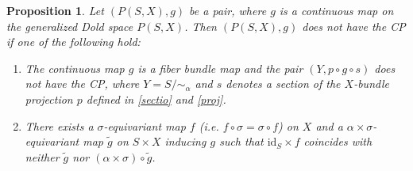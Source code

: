 \documentclass{amsart}
\newtheorem{proposition}[theorem]{Proposition}
\begin{document}
	
	\begin{proposition}\label{necessary condition}
		Let $(P(S,X),g)$ be a pair, where $g$ is a continuous map on the generalized Dold space $P(S,X)$. Then $(P(S,X),g)$ does not have the CP if one of the following hold:
		\begin{enumerate}
			\item The continuous map $g$ is a fiber bundle map and the pair $(Y,p \circ g \circ s)$ does not have the CP, 
			where $Y = S/\!\!\sim_\alpha$ and $s$ denotes a section of the $X$-bundle projection $p$ defined in \eqref{sectio} and \eqref{proj}.
			
			\item  
			There exists a $\sigma$-equivariant map $f$ (i.e. $f\circ\sigma =\sigma\circ f$) on $X$ and a $\alpha \times \sigma$-equivariant map $\tilde g$ on $S\times X$ inducing $g$ such that
			$\mathrm{id}_S \times f$ coincides with neither $\tilde{g}$ nor
			$(\alpha \times \sigma) \circ \tilde{g}$.
		\end{enumerate}
		
		
		
	\end{proposition}
\end{document}
